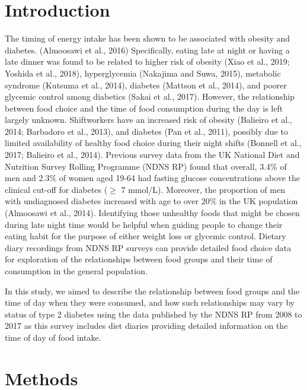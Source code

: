 \documentclass[utf8]{frontiersSCNS}
\begin{document}
\hypertarget{introduction}{%
\section*{Introduction}\label{introduction}}

The timing of energy intake has been shown to be associated with obesity
and diabetes. (Almoosawi et al., 2016) Specifically, eating late at
night or having a late dinner was found to be related to higher risk of
obesity (Xiao et al., 2019; Yoshida et al., 2018), hyperglycemia
(Nakajima and Suwa, 2015), metabolic syndrome (Kutsuma et al., 2014),
diabetes (Mattson et al., 2014), and poorer glycemic control among
diabetics (Sakai et al., 2017). However, the relationship between food
choice and the time of food consumption during the day is left largely
unknown. Shiftworkers have an increased risk of obesity (Balieiro et
al., 2014; Barbadoro et al., 2013), and diabetes (Pan et al., 2011),
possibly due to limited availability of healthy food choice during their
night shifts (Bonnell et al., 2017; Balieiro et al., 2014). Previous
survey data from the UK National Diet and Nutrition Survey Rolling
Programme (NDNS RP) found that overall, 3.4\% of men and 2.3\% of women
aged 19-64 had fasting glucose concentrations above the clinical cut-off
for diabetes (\(\geqslant\) 7 mmol/L). Moreover, the proportion of men
with undiagnosed diabetes increased with age to over 20\% in the UK
population (Almoosawi et al., 2014). Identifying those unhealthy foods
that might be chosen during late night time would be helpful when
guiding people to change their eating habit for the purpose of either
weight loss or glycemic control. Dietary diary recordings from NDNS RP
surveys can provide detailed food choice data for exploration of the
relationships between food groups and their time of consumption in the
general population.

In this study, we aimed to describe the relationship between food groups
and the time of day when they were consumed, and how such relationships
may vary by status of type 2 diabetes using the data published by the
NDNS RP from 2008 to 2017 as this survey includes diet diaries providing
detailed information on the time of day of food intake.

\hypertarget{methods}{%
\section*{Methods}\label{methods}}
\end{document}
